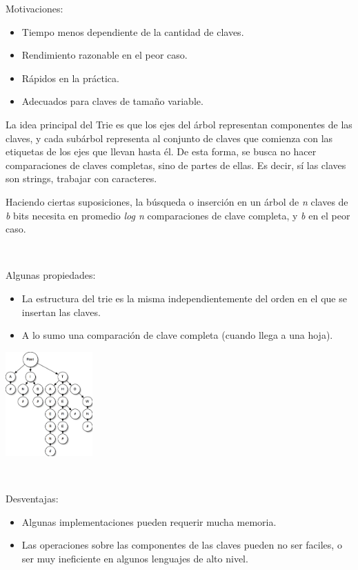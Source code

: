 Motivaciones:
\begin{itemize}
 \item Tiempo menos dependiente de la cantidad de claves.
 \item Rendimiento razonable en el peor caso.
 \item R\'apidos en la pr\'actica.
 \item Adecuados para claves de tamaño variable.
\end{itemize}

La idea principal del Trie es que los ejes del \'arbol representan componentes de las claves, y cada sub\'arbol representa al conjunto de claves que comienza con las etiquetas de los ejes que llevan hasta \'el. 
De esta forma, se busca no hacer comparaciones de claves completas, sino de partes de ellas. Es decir, s\'i las claves son strings, trabajar con caracteres.

Haciendo ciertas suposiciones, la b\'usqueda o inserci\'on en un \'arbol de \textit{n} claves de \textit{b} bits necesita en promedio \textit{log n} comparaciones de clave completa, y \textit{b} en el peor caso.

~

Algunas propiedades:
\begin{itemize}
 \item La estructura del trie es la misma independientemente del orden en el que se insertan las claves.
 \item A lo sumo una comparaci\'on de clave completa (cuando llega a una hoja).
\end{itemize}

\begin{center}
 \includegraphics[width=0.25\textwidth, height=0.3\textwidth]{./graficos/trie-simple.png}
\end{center}

~

Desventajas:
\begin{itemize}
 \item Algunas implementaciones pueden requerir mucha memoria.
 \item Las operaciones sobre las componentes de las claves pueden no ser faciles, o ser muy ineficiente en algunos lenguajes de alto nivel.
\end{itemize}

